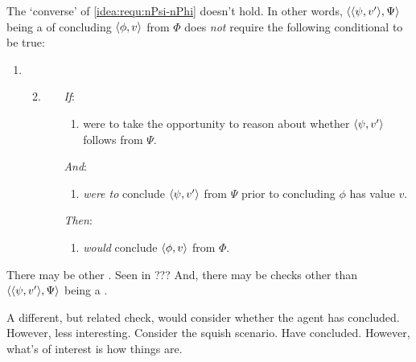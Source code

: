 \begin{note}
  The `converse' of \ref{idea:requ:nPsi-nPhi} doesn't hold.
  In other words, \(\langle \langle \psi, v' \rangle, \Psi \rangle\) being a \requ{} of concluding \(\langle \phi, v \rangle\) from \(\Phi\) does \emph{not} require the following conditional to be true:
  \begin{enumerate}[label=]
  \item
  \begin{enumerate}[label=]
    \setcounter{enumi}{1}
      \item
        \label{idea:requ:nPsi-nPhi:conv}
        \begin{enumerate}
        \item[\emph{If}:]
          \begin{enumerate}[label=\alph*., ref=\named{R:b.\alph*}]
          \item
            \vAgent{} were to take the opportunity to reason about whether \(\langle \psi, v' \rangle\) follows from \(\Psi\).
          \end{enumerate}
        \item[\emph{And}:]
          \begin{enumerate}[label=\alph*., ref=\named{R:b.\alph*}, resume]
          \item
            \vAgent{} \emph{were to} conclude \(\langle \psi, v' \rangle\) from \(\Psi\) prior to concluding \(\phi\) has value \(v\).
          \end{enumerate}
        \item[\emph{Then}:]
          \begin{enumerate}[label=\alph*., ref=\named{R:b.\alph*}, resume]
          \item
            \vAgent{} \emph{would} conclude \(\langle \phi, v \rangle\) from \(\Phi\).
          \end{enumerate}
        \end{enumerate}
      \end{enumerate}
    \end{enumerate}

    There may be other \requ{}.
    {
      \color{red}
      Seen in ???
    }
  And, there may be checks other than \(\langle \langle \psi, v' \rangle, \Psi \rangle\) being a \requ{}.

  A different, but related check, would consider whether the agent has concluded.
  However, less interesting.
  Consider the squish scenario.
  Have concluded.
  However, what's of interest is how things are.
\end{note}

